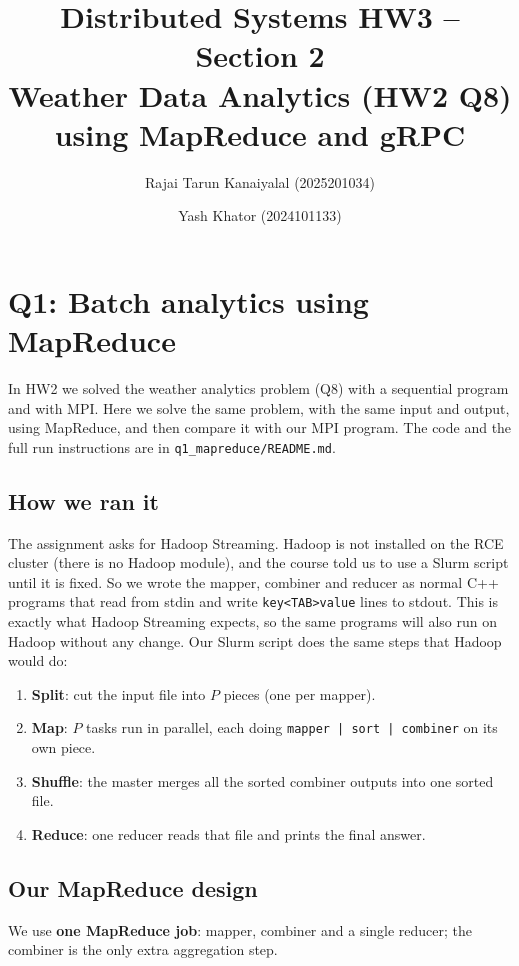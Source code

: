 \documentclass[10pt,a4paper]{article}
\title{Distributed Systems HW3 -- Section 2\\
\large Weather Data Analytics (HW2 Q8) using MapReduce and gRPC}
\author{Rajai Tarun Kanaiyalal (2025201034) \and Yash Khator (2024101133)}
\date{}
\newcommand{\code}[1]{\texttt{#1}}
\begin{document}
\maketitle

\section{Q1: Batch analytics using MapReduce}

In HW2 we solved the weather analytics problem (Q8) with a sequential program and with MPI. Here we solve the same problem,
with the same input and output, using MapReduce, and then compare it with our MPI program. The code and the full run
instructions are in \code{q1\_mapreduce/README.md}.

\subsection{How we ran it}
The assignment asks for Hadoop Streaming. Hadoop is not installed on the RCE cluster (there is no Hadoop module), and the
course told us to use a Slurm script until it is fixed. So we wrote the mapper, combiner and reducer as normal C++ programs
that read from stdin and write \code{key<TAB>value} lines to stdout. This is exactly what Hadoop Streaming expects, so the same
programs will also run on Hadoop without any change. Our Slurm script does the same steps that Hadoop would do:

\begin{enumerate}
\item \textbf{Split}: cut the input file into $P$ pieces (one per mapper).
\item \textbf{Map}: $P$ tasks run in parallel, each doing \code{mapper | sort | combiner} on its own piece.
\item \textbf{Shuffle}: the master merges all the sorted combiner outputs into one sorted file.
\item \textbf{Reduce}: one reducer reads that file and prints the final answer.
\end{enumerate}

\subsection{Our MapReduce design}
We use \textbf{one MapReduce job}: mapper, combiner and a single reducer; the combiner is the only extra aggregation step.
\end{document}

